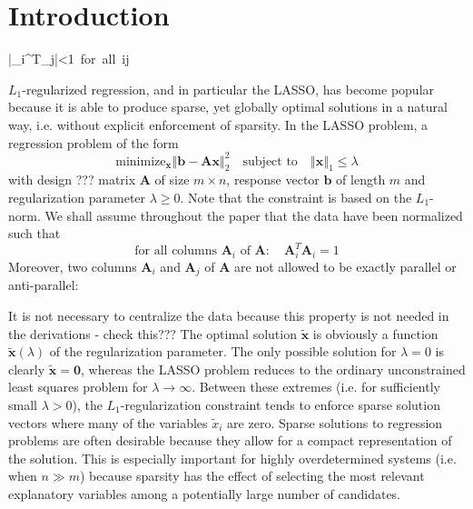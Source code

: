 \section{Introduction}



\left|_{i}^{T}_{j}\right|<1\mbox{ for all }i\ne j


$L_{1}$-regularized regression, and in particular the LASSO, has
become popular because it is able to produce sparse, yet globally
optimal solutions in a natural way, i.e. without explicit enforcement
of sparsity. In the LASSO problem, a regression problem of the form
\begin{equation}
\textrm{minimize}_{\mathbf{x}}\left\Vert \mathbf{b}-\mathbf{Ax}\right\Vert _{2}^{2}\quad\textrm{subject to}\quad\left\Vert \mathbf{x}\right\Vert _{1}\le\lambda\label{eq:lasso-problem}
\end{equation}
with design ??? matrix $\mathbf{A}$ of size $m\times n$, response
vector $\mathbf{b}$ of length $m$ and regularization parameter $\lambda\ge0$.
Note that the constraint is based on the $L_{1}$-norm. We shall assume
throughout the paper that the data have been normalized such that
\begin{equation}
\textrm{for all columns }\mathbf{A}_{i}\mbox{ of }\mathbf{A}:\quad\mathbf{A}_{i}^{T}\mathbf{A}_{i}=1\label{eq:normalization}
\end{equation}
Moreover, two columns $\mathbf{A}_{i}$ and $\mathbf{A}_{j}$ of $\mathbf{A}$
are not allowed to be exactly parallel or anti-parallel:


It is not necessary to centralize the data because this property is
not needed in the derivations - check this??? The optimal solution
$\tilde{\mathbf{x}}$ is obviously a function $\tilde{\mathbf{x}}\left(\lambda\right)$
of the regularization parameter. The only possible solution for $\lambda=0$
is clearly $\mathbf{\tilde{x}}=\mathbf{0}$, whereas the LASSO problem
reduces to the ordinary unconstrained least squares problem for $\lambda\rightarrow\infty$.
Between these extremes (i.e. for sufficiently small $\lambda>0$),
the $L_{1}$-regularization constraint tends to enforce sparse solution
vectors where many of the variables $\tilde{x}_{i}$ are zero. Sparse
solutions to regression problems are often desirable because they
allow for a compact representation of the solution. This is especially
important for highly overdetermined systems (i.e. when $n\gg m$)
because sparsity has the effect of selecting the most relevant explanatory
variables among a potentially large number of candidates. 



